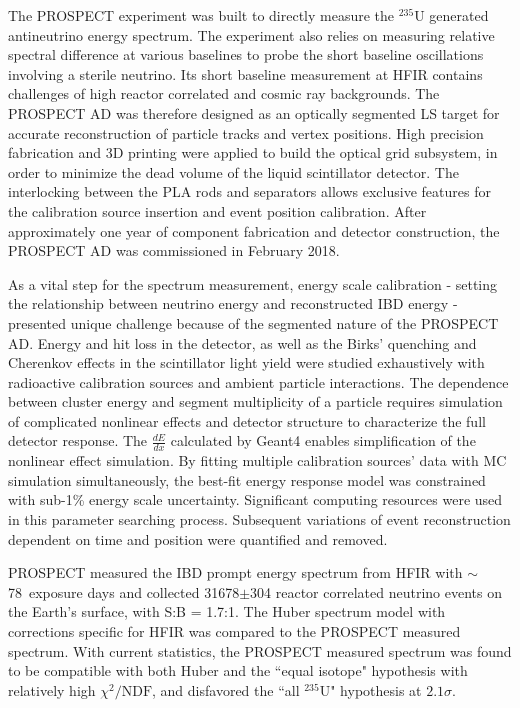 \label{Ch10}

The PROSPECT experiment was built to directly measure the $^{235}$U generated antineutrino energy spectrum.
The experiment also relies on measuring relative spectral difference at various baselines to probe the short baseline oscillations involving a sterile neutrino.
Its short baseline measurement at HFIR contains challenges of high reactor correlated and cosmic ray backgrounds. 
The PROSPECT AD was therefore designed as an optically segmented LS target for accurate reconstruction of particle tracks and vertex positions.
High precision fabrication and 3D printing were applied to build the optical grid subsystem, in order to minimize the dead volume of the liquid scintillator detector.
The interlocking between the PLA rods and separators allows exclusive features for the calibration source insertion and event position calibration.
After approximately one year of component fabrication and detector construction, the PROSPECT AD was commissioned in February 2018.

As a vital step for the \Ulow spectrum measurement, energy scale calibration - setting the relationship between neutrino energy and reconstructed IBD energy - presented unique challenge because of the segmented nature of the PROSPECT AD. 
Energy and hit loss in the detector, as well as the Birks' quenching and Cherenkov effects in the scintillator light yield were studied exhaustively with radioactive calibration sources and ambient particle interactions.
The dependence between cluster energy and segment multiplicity of a particle requires simulation of complicated nonlinear effects and detector structure to characterize the full detector response. 
The $\frac{dE}{dx}$ calculated by Geant4 enables simplification of the nonlinear effect simulation.
By fitting multiple calibration sources' data with MC simulation simultaneously, the best-fit energy response model was constrained with sub-1\% energy scale uncertainty.
Significant computing resources were used in this parameter searching process.
Subsequent variations of event reconstruction dependent on time and position were quantified and removed.

PROSPECT measured the IBD prompt energy spectrum from HFIR with $\sim$78~exposure days and collected 31678$\pm$304 reactor correlated neutrino events on the Earth's surface, with S:B = 1.7:1.
The Huber spectrum model with corrections specific for HFIR was compared to the PROSPECT measured spectrum. 
With current statistics, the PROSPECT measured spectrum was found to be compatible with both Huber and the ``equal isotope" hypothesis with relatively high $\chi^2/\mathrm{NDF}$, and disfavored the ``all $^{235}$U" hypothesis at $2.1\sigma$.

